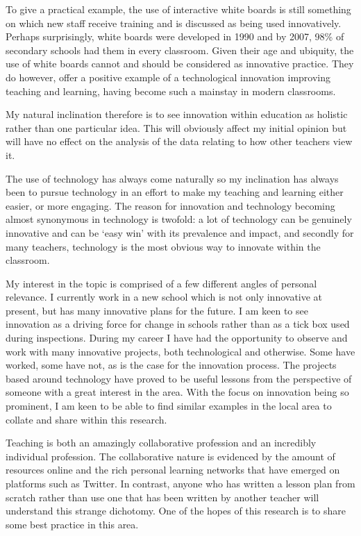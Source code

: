 \documentclass[11pt]{article}
\begin{document}
To give a practical example, the use of interactive white boards is still something on which new staff receive training and is discussed as being used innovatively. Perhaps surprisingly, white boards were developed in 1990 and by 2007, 98\% \citep{kitchen2008harnessing} of secondary schools had them in every classroom. Given their age and ubiquity, the use of white boards cannot and should be considered as innovative practice. They do however, offer a positive example of a technological innovation improving teaching and learning, having become such a mainstay in modern classrooms.

My natural inclination therefore is to see innovation within education as holistic rather than one particular idea. This will obviously affect my initial opinion but will have no effect on the analysis of the data relating to how other teachers view it.

The use of technology has always come naturally so my inclination has always been to pursue technology in an effort to make my teaching and learning either easier, or more engaging. The reason for innovation and technology becoming almost synonymous in technology is twofold: a lot of technology can be genuinely innovative and can be `easy win' with its prevalence and impact, and secondly for many teachers, technology is the most obvious way to innovate within the classroom.

My interest in the topic is comprised of a few different angles of personal relevance. I currently work in a new school which is not only innovative at present, but has many innovative plans for the future. I am keen to see innovation as a driving force for change in schools rather than as a tick box used during inspections. During my career I have had the opportunity to observe and work with many innovative projects, both technological and otherwise. Some have worked, some have not, as is the case for the innovation process. The projects based around technology have proved to be useful lessons from the perspective of someone with a great interest in the area. With the focus on innovation being so prominent, I am keen to be able to find similar examples in the local area to collate and share within this research.

Teaching is both an amazingly collaborative profession and an incredibly individual profession. The collaborative nature is evidenced by the amount of resources online and the rich personal learning networks that have emerged on platforms such as Twitter. In contrast, anyone who has written a lesson plan from scratch rather than use one that has been written by another teacher will understand this strange dichotomy. One of the hopes of this research is to share some best practice in this area.
\end{document}
